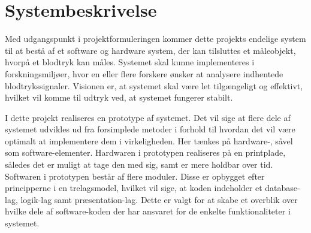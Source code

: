 \chapter{Systembeskrivelse}
Med udgangspunkt i projektformuleringen kommer dette projekts endelige system til at bestå af et software og hardware system, der kan tilsluttes et måleobjekt, hvorpå et blodtryk kan måles. Systemet skal kunne implementeres i forskningsmiljøer, hvor en eller flere forskere ønsker at analysere indhentede blodtrykssignaler. Visionen er, at systemet skal være let tilgængeligt og effektivt, hvilket vil komme til udtryk ved, at systemet fungerer stabilt.

I dette projekt realiseres en prototype af systemet. Det vil sige at flere dele af systemet udvikles ud fra forsimplede metoder i forhold til hvordan det vil være optimalt at implementere dem i virkeligheden. Her tænkes på hardware-, såvel som software-elementer. Hardwaren i prototypen realiseres på en printplade, således det er muligt at tage den med sig, samt er mere holdbar over tid. Softwaren i prototypen består af flere moduler. Disse er opbygget efter principperne i en trelagsmodel, hvilket vil sige, at koden indeholder et database-lag, logik-lag samt præsentation-lag. Dette er valgt for at skabe et overblik over hvilke dele af software-koden der har ansvaret for de enkelte funktionaliteter i systemet.

